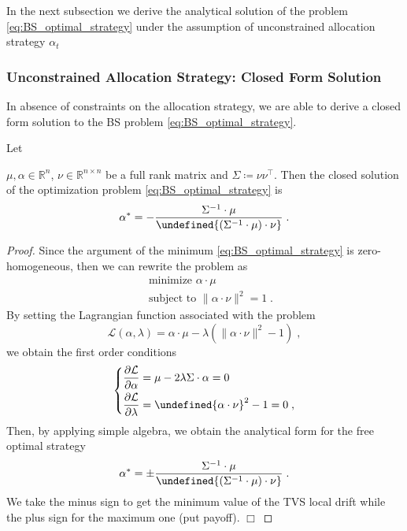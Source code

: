 \documentclass[runningheads]{m2ef}
\newcommand{\tr}[1]{{#1}^{\intercal}} %
\newenvironment{eqsys}{\begin{equation}\begin{dcases}}{\end{dcases}\end{equation}}
\let\norm\undefined %
\DeclarePairedDelimiter\norm{\lVert}{\rVert}
\newcommand\soutpars[1]{\let\helpcmd\sout\parhelp#1\par\relax\relax}
\newcommand{\change}[1]{{\color{red} {#1}}}%
\newcommand{\remove}[1]{{\color{red} \soutpars{{#1}}}}%
\begin{document}
\change{In the next subsection we derive the analytical solution of the problem \eqref{eq:BS_optimal_strategy} under the assumption of unconstrained allocation strategy $\alpha_t$}


\subsubsection{Unconstrained Allocation Strategy: Closed Form Solution}
In absence of constraints on the allocation strategy, we are able to derive a closed form solution to the BS problem \eqref{eq:BS_optimal_strategy}.
\begin{lemma}
	Let \remove{be} $\mu, \alpha \in \mathbb{R}^n$, $\nu \in \mathbb{R}^{n\times n}$ be a full rank matrix and $\Sigma\coloneqq \nu \tr{\nu}$. Then the closed solution of the optimization problem \eqref{eq:BS_optimal_strategy} is 
	\begin{equation}
			\alpha^* = - \frac{\Sigma^{-1} \cdot \mu}{\norm{(\Sigma^{-1} \cdot \mu)\cdot \nu}} \; .
	\end{equation}
\end{lemma}
\begin{proof}
Since the argument of the minimum \eqref{eq:BS_optimal_strategy} is zero-homogeneous, then we can rewrite the problem as
\begin{equation}
		\begin{aligned}
			&\text { minimize } \alpha \cdot \mu\\
			&\text { subject to } \|\alpha \cdot \nu\|^2=1 \; .
	\end{aligned}
\end{equation}
By setting the Lagrangian function associated with the problem
\begin{equation}
	\mathcal{L}\left(\alpha, \lambda\right)=\alpha \cdot \mu-\lambda\left(\|\alpha \cdot \nu\|^2-1\right) \; ,
\end{equation}
we obtain the first order conditions
\begin{eqsys}
	\frac{\partial \mathcal{L}}{\partial \alpha}=\mu -2\lambda \Sigma \cdot \alpha=0 \\
	\frac{\partial \mathcal{L}}{\partial \lambda}= \norm{\alpha \cdot \nu}^2-1=0
	\; ,
\end{eqsys}
Then, by applying simple algebra, we obtain the analytical form for the free optimal strategy
\begin{equation}
	\alpha^* = \pm \frac{\Sigma^{-1} \cdot \mu}{\norm{(\Sigma^{-1} \cdot \mu)\cdot \nu}} \; .
\label{eq:analytical_solution_free_strategy}\end{equation}
We take the minus sign to get the minimum value of the TVS local drift while the plus sign for the maximum one (put payoff). $\Box$
\end{proof}
\end{document}
